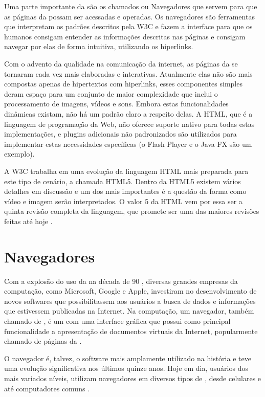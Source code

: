\documentclass[espaco=simples,appendix=Name]{abnt}
\begin{document}
Uma parte importante da  são os chamados  ou Navegadores que servem para que as páginas da  possam ser acessadas e operadas. Os navegadores são ferramentas que interpretam os padrões descritos pela W3C e fazem a interface para que os humanos consigam entender as informações descritas nas páginas e consigam navegar por elas de forma intuitiva, utilizando os hiperlinks.

Com o advento da qualidade na comunicação da internet, as páginas da  se tornaram cada vez mais elaboradas e interativas. Atualmente elas não são mais compostas apenas de hipertextos com hiperlinks, esses componentes simples deram espaço para um conjunto de maior complexidade que inclui o processamento de imagens, vídeos e sons. Embora estas funcionalidades dinâmicas existam, não há um padrão claro a respeito delas. A HTML, que é a linguagem de programação da Web, não oferece suporte nativo para todas estas implementações, e plugins adicionais não padronizados são utilizados para implementar estas necessidades específicas (o Flash Player e o Java FX são um exemplo).

A W3C trabalha em uma evolução da linguagem HTML mais preparada para este tipo de cenário, a chamada HTML5. Dentro da HTML5 existem vários detalhes em discussão e um dos mais importantes é a questão da forma como vídeo e imagem serão interpretados. O valor 5 da HTML vem por essa ser a quinta revisão completa da linguagem, que promete ser uma das maiores revisões feitas até hoje \cite{HTML5spec}.


\section{Navegadores}

Com a explosão do uso da  na década de 90 \cite{BloombergGameChangers}, diversas grandes empresas da computação, como Microsoft, Google e Apple, investiram no desenvolvimento de novos softwares que possibilitassem aos usuários a busca de dados e informações que estivessem publicadas na Internet. Na computação, um navegador, também chamado de , é um  com uma interface gráfica que possui como principal funcionalidade a apresentação de documentos virtuais da Internet, popularmente chamado de páginas da .

O navegador é, talvez, o software mais amplamente utilizado na história e teve uma evolução significativa nos últimos quinze anos. Hoje em dia, usuários dos mais variados níveis, utilizam navegadores em diversos tipos de , desde celulares e  até computadores comuns \cite{ArchitectureWebBrowsers}.
\end{document}
